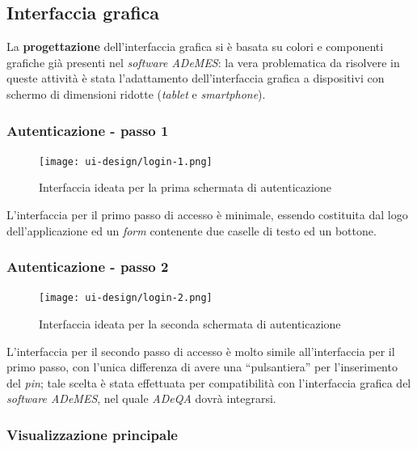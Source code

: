\subsection{Interfaccia grafica}
La \textbf{progettazione} dell'interfaccia grafica si è basata su colori e componenti grafiche già presenti nel \textit{software ADeMES}: la vera problematica da risolvere in queste attività è stata l'adattamento dell'interfaccia grafica a dispositivi con schermo di dimensioni ridotte (\textit{tablet} e \textit{smartphone}).

\subsubsection*{Autenticazione - passo 1}

\begin{figure}[H]
    \centering
    \texttt{[image: ui-design/login-1.png]}
    \caption{Interfaccia ideata per la prima schermata di autenticazione}
\end{figure}
L’interfaccia per il primo passo di accesso è minimale, essendo costituita dal logo dell’applicazione ed un \textit{form} contenente due caselle di testo ed un bottone.

\subsubsection*{Autenticazione - passo 2}

\begin{figure}[H]
    \centering
    \texttt{[image: ui-design/login-2.png]}
    \caption{Interfaccia ideata per la seconda schermata di autenticazione}
\end{figure}
L’interfaccia per il secondo passo di accesso è molto simile all’interfaccia per il primo passo, con l’unica differenza di avere una “pulsantiera” per l’inserimento del \textit{pin}; tale scelta è stata effettuata per compatibilità con l’interfaccia grafica del \textit{software ADeMES}, nel quale \textit{ADeQA} dovrà integrarsi.

\subsubsection*{Visualizzazione principale}

